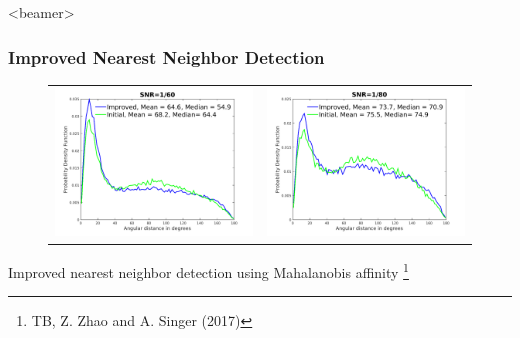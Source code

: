 \documentclass{beamer}
\newcommand\blfootnote[1]{%
  \begingroup
  \renewcommand\thefootnote{}\footnote{#1}%
  \addtocounter{footnote}{-1}%
  \endgroup
}
\begin{document}

\begin{frame}<beamer>
\frametitle{Improved Nearest Neighbor Detection}
\begin{figure}
\begin{center}
\begin{tabular}{cc}
\includegraphics[width=.49\columnwidth]{figures/fighist_snr1by60.png} & \includegraphics[width=.49\columnwidth]{figures/fighist_snr1by80.png}
\end{tabular}
\end{center}
\end{figure}
Improved nearest neighbor detection using Mahalanobis affinity\blfootnote{TB, Z. Zhao and A. Singer (2017)}
\end{frame}
\end{document}
